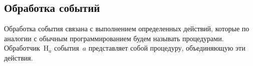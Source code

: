    \begin{multicols}{2}

\subsection{Обработка событий}

    Обработка события связана с выполнением определенных действий, 
которые по аналогии с обычным программированием будем называть 
процедурами. Обработчик~H$_a$ события~$a$ представляет собой 
процедуру, объединяющую эти действия. 

    \begin{table*}[b]\small
    \begin{center}
    \vspace*{-12pt}
    \vspace*{2ex}
    

\end{center}
\end{table*}
\end{multicols}
